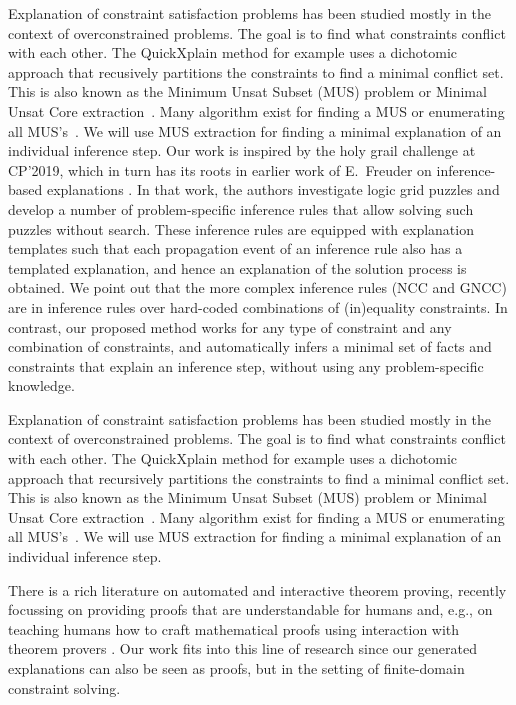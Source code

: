 Explanation of constraint satisfaction problems has been studied mostly in the context of overconstrained problems. The goal is to find what constraints conflict with each other. The QuickXplain method \cite{junker2001quickxplain} for example uses a dichotomic approach that recusively partitions the constraints to find a minimal conflict set. This is also known as the Minimum Unsat Subset (MUS) problem or Minimal Unsat Core extraction~\cite{marques2010minimal}. Many algorithm exist for finding a MUS or enumerating all MUS's~\cite{marques2010minimal}. We will use MUS extraction for finding a minimal explanation of an individual inference step.
Our work is inspired by the holy grail challenge at CP'2019, which in turn has its roots in earlier work of E.~Freuder on inference-based explanations \cite{sqalli1996inference}. In that work, the authors investigate logic grid puzzles and develop a number of problem-specific inference rules that allow solving such puzzles without search. These inference rules are equipped with explanation templates such that each propagation event of an inference rule also has a templated explanation, and hence an explanation of the solution process is obtained. We point out that the more complex inference rules (NCC and GNCC) are in inference rules over hard-coded combinations of (in)equality constraints. In contrast, our proposed method works for any type of constraint and any combination of constraints, and automatically infers a minimal set of facts and constraints that explain an inference step, without using any problem-specific knowledge. %

Explanation of constraint satisfaction problems has been studied mostly in the context of overconstrained problems. The goal is to find what constraints conflict with each other. 
The QuickXplain method \cite{junker2001quickxplain} for example uses a dichotomic approach that recursively partitions the constraints to find a minimal conflict set. 
This is also known as the Minimum Unsat Subset (MUS) problem or Minimal Unsat Core extraction~\cite{marques2010minimal}. Many algorithm exist for finding a MUS or enumerating all MUS's~\cite{marques2010minimal}. We will use MUS extraction for finding a minimal explanation of an individual inference step.


There is a rich literature on automated and interactive theorem proving, recently focussing on providing proofs that are understandable for humans \cite{Ganesalingam2017} and, e.g.,  on teaching humans how to craft mathematical proofs using interaction with theorem provers \cite{DBLP:conf/icml/YangD19}. 
Our work fits into this line of research since our generated explanations can also be seen as proofs, but in the setting of finite-domain constraint solving.

